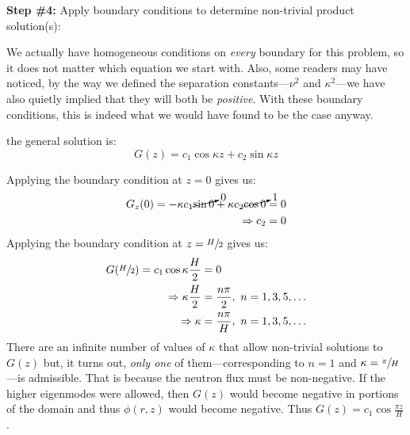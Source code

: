 \vspace{0.25cm}

\noindent\textbf{Step \#4:} Apply boundary conditions to determine non-trivial product solution(s):

\vspace{0.25cm}

\noindent We actually have homogeneous conditions on \emph{every} boundary for this problem, so it does not matter which equation we start with. Also, some readers may have noticed, by the way we defined the separation constants---$\nu^2$ and $\kappa^2$---we have also quietly implied that they will both be \emph{positive}.  With these boundary conditions, this is indeed what we would have found to be the case anyway.

 the general solution is:
\begin{equation*}
G(z) = c_1\cos{\kappa z} + c_2 \sin{\kappa z}
\end{equation*}

Applying the boundary condition at $z=0$ gives us:
\begin{align*}
G_z(0) = -\kappa c_1 \cancelto{0}{\sin{0}} + \kappa c_2 \cancelto{1}{\cos{0}} &= 0 \\
\Rightarrow c_2 &= 0 
\end{align*}
Applying the boundary condition at $z=\sfrac{H}{2}$ gives us:
\begin{align*}
G(\sfrac{H}{2}) = c_1 \cos{\kappa \frac{H}{2}} &= 0 \\
\Rightarrow \kappa \frac{H}{2} &= \frac{n\pi}{2}, \ n=1,3,5,\dots \\
\Rightarrow \kappa &= \frac{n \pi}{H}, \ n=1,3,5,\dots
\end{align*}
There are an infinite number of values of $\kappa$ that allow non-trivial solutions to $G(z)$ but, it turns out, \emph{only one} of them---corresponding to $n=1$ and $\kappa = \sfrac{\pi}{H}$---is admissible.  That is because the neutron flux must be non-negative.  If the higher eigenmodes were allowed, then $G(z)$ would become negative in portions of the domain and thus $\phi(r,z)$ would become negative. Thus $G(z) = c_1\cos{\frac{\pi z}{H}}$.  

